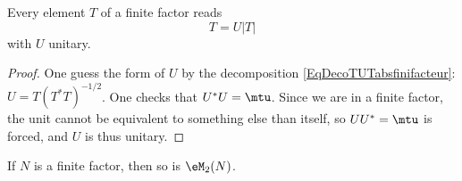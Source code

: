 \begin{proposition}		\label{PropDecoTUTabsfinifacteur}
Every element $T$ of a finite factor reads
\begin{equation}	\label{EqDecoTUTabsfinifacteur}
	T=U| T |
\end{equation}
with $U$ unitary.
\end{proposition}

\begin{proof}
One guess the form of $U$ by the decomposition \eqref{EqDecoTUTabsfinifacteur}: $U=T(T^*T)^{-1/2}$. One checks that $U^*U=\mtu$. Since we are in a finite factor, the unit cannot be equivalent to something else than itself, so $UU^*=\mtu$ is forced, and $U$ is thus unitary.
\end{proof}

\begin{proposition}	
If $N$ is a finite factor, then so is $\eM_2(N)$.
\end{proposition}

